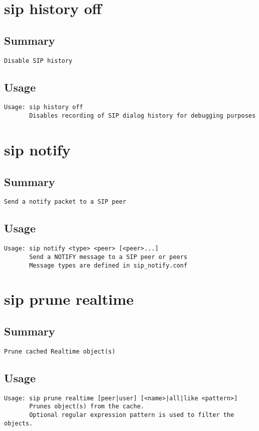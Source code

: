 \section{sip history off}
\subsection{Summary}
\begin{verbatim}
Disable SIP history
\end{verbatim}
\subsection{Usage}
\begin{verbatim}
Usage: sip history off
       Disables recording of SIP dialog history for debugging purposes

\end{verbatim}


\section{sip notify}
\subsection{Summary}
\begin{verbatim}
Send a notify packet to a SIP peer
\end{verbatim}
\subsection{Usage}
\begin{verbatim}
Usage: sip notify <type> <peer> [<peer>...]
       Send a NOTIFY message to a SIP peer or peers
       Message types are defined in sip_notify.conf

\end{verbatim}


\section{sip prune realtime}
\subsection{Summary}
\begin{verbatim}
Prune cached Realtime object(s)
\end{verbatim}
\subsection{Usage}
\begin{verbatim}
Usage: sip prune realtime [peer|user] [<name>|all|like <pattern>]
       Prunes object(s) from the cache.
       Optional regular expression pattern is used to filter the objects.

\end{verbatim}


